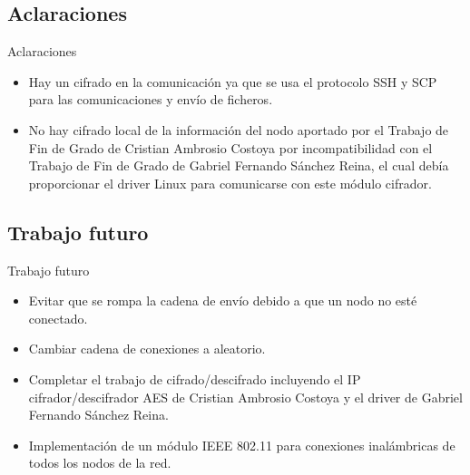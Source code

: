 \documentclass[aspectratio=169]{beamer}
\begin{document}
\subsection{Aclaraciones}
\begin{frame}{Aclaraciones}
	\begin{itemize}
		\item Hay un cifrado en la comunicación ya que se usa el protocolo SSH y SCP para las comunicaciones y envío de ficheros.
		\item No hay cifrado local de la información del nodo aportado por el Trabajo de Fin de Grado de Cristian Ambrosio Costoya por incompatibilidad con el Trabajo de Fin de Grado de Gabriel Fernando Sánchez Reina, el cual debía proporcionar el driver Linux para comunicarse con este módulo cifrador.
	\end{itemize}
\end{frame}

\subsection{Trabajo futuro}
\begin{frame}{Trabajo futuro}
\begin{itemize}
	\item Evitar que se rompa la cadena de envío debido a que un nodo no esté conectado.
	\item Cambiar cadena de conexiones a aleatorio.
	\item Completar el trabajo de cifrado/descifrado incluyendo el IP cifrador/descifrador AES de Cristian Ambrosio Costoya y el driver de Gabriel Fernando Sánchez Reina.
	\item Implementación de un módulo IEEE 802.11 para conexiones inalámbricas de todos los nodos de la red.
\end{itemize}
\end{frame}
\end{document}
